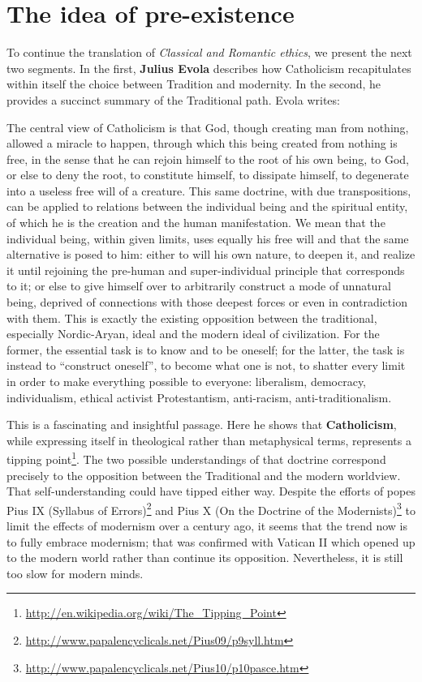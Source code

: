 \section{The idea of pre-existence}

To continue the translation of \textit{Classical and Romantic ethics}, we present the next two segments. In the first, \textbf{Julius Evola} describes how Catholicism recapitulates within itself the choice between Tradition and modernity. In the second, he provides a succinct summary of the Traditional path. Evola writes:

\begin{quotex}
The central view of Catholicism is that God, though creating man from nothing, allowed a miracle to happen, through which this being created from nothing is free, in the sense that he can rejoin himself to the root of his own being, to God, or else to deny the root, to constitute himself, to dissipate himself, to degenerate into a useless free will of a creature. This same doctrine, with due transpositions, can be applied to relations between the individual being and the spiritual entity, of which he is the creation and the human manifestation. We mean that the individual being, within given limits, uses equally his free will and that the same alternative is posed to him: either to will his own nature, to deepen it, and realize it until rejoining the pre-human and super-individual principle that corresponds to it; or else to give himself over to arbitrarily construct a mode of unnatural being, deprived of connections with those deepest forces or even in contradiction with them. This is exactly the existing opposition between the traditional, especially Nordic-Aryan, ideal and the modern ideal of civilization. For the former, the essential task is to know and to be oneself; for the latter, the task is instead to ``construct oneself'', to become what one is not, to shatter every limit in order to make everything possible to everyone: liberalism, democracy, individualism, ethical activist Protestantism, anti-racism, anti-traditionalism.
\end{quotex}


This is a fascinating and insightful passage. Here he shows that \textbf{Catholicism}, while expressing itself in theological rather than metaphysical terms, represents a tipping point\footnote{\url{http://en.wikipedia.org/wiki/The\_Tipping\_Point}}. The two possible understandings of that doctrine correspond precisely to the opposition between the Traditional and the modern worldview. That self-understanding could have tipped either way. Despite the efforts of popes Pius IX (Syllabus of Errors)\footnote{\url{http://www.papalencyclicals.net/Pius09/p9syll.htm}} and Pius X (On the Doctrine of the Modernists)\footnote{\url{http://www.papalencyclicals.net/Pius10/p10pasce.htm}} to limit the effects of modernism over a century ago, it seems that the trend now is to fully embrace modernism; that was confirmed with Vatican II which opened up to the modern world rather than continue its opposition. Nevertheless, it is still too slow for modern minds.

